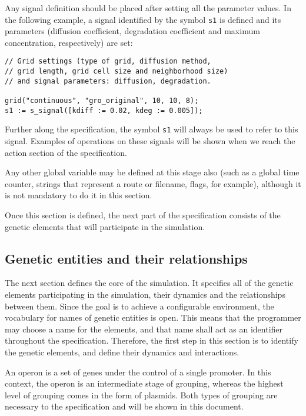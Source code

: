 \documentclass[10pt,a4paper]{article}
\begin{document}
Any signal definition should be placed after setting all the parameter values. In the following example, a signal identified by the symbol \texttt{s1} is defined and its parameters (diffusion coefficient, degradation coefficient and maximum concentration, respectively) are set:

\begin{Verbatim}[obeytabs]
// Grid settings (type of grid, diffusion method, 
// grid length, grid cell size and neighborhood size) 
// and signal parameters: diffusion, degradation.

grid("continuous", "gro_original", 10, 10, 8);
s1 := s_signal([kdiff := 0.02, kdeg := 0.005]);
\end{Verbatim}

Further along the specification, the symbol \texttt{s1} will always be used to refer to this signal. Examples of operations on these signals will be shown when we reach the action section of the specification. \newline

Any other global variable may be defined at this stage also (such as a global time counter, strings that represent a route or filename, flags, for example), although it is not mandatory to do it in this section. \newline

Once this section is defined, the next part of the specification consists of the genetic elements that will participate in the simulation.
\newline 

\subsection{Genetic entities and their relationships}

The next section defines the core of the simulation. It specifies all of the genetic elements participating in the simulation, their dynamics and the relationships between them. Since the goal is to achieve a configurable environment, the vocabulary for names of genetic entities is open. This means that the programmer may choose a name for the elements, and that name shall act as an identifier throughout the specification. Therefore, the first step in this section is to identify the genetic elements, and define their dynamics and interactions.
\newline

An operon is a set of genes under the control of a single promoter. In this context, the operon is an intermediate stage of grouping, whereas the highest level of grouping comes in the form of plasmids. Both types of grouping are necessary to the specification and will be shown in this document. \newline
\end{document}
